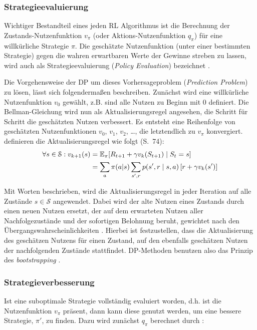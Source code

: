 \subsubsection{Strategieevaluierung}\label{sec:evaluierung}
Wichtiger Bestandteil eines jeden RL Algorithmus ist die Berechnung der Zustands-Nutzenfunktion $v_\pi$ (oder Aktions-Nutzenfunktion $q_\pi$) für eine willkürliche Strategie $\pi$. Die geschätzte Nutzenfunktion (unter einer bestimmten Strategie) gegen die wahren erwartbaren Werte der Gewinne streben zu lassen, wird auch als Strategieevaluierung (\textit{Policy Evaluation}) bezeichnet \cite[S.~74]{Sutton1998}.
\par 
Die Vorgehensweise der DP um dieses Vorhersageproblem (\textit{Prediction Problem}) zu lösen, lässt sich folgendermaßen beschreiben. Zunächst wird eine willkürliche Nutzenfunktion $v_0$ gewählt, z.B. sind alle Nutzen zu Beginn mit 0 definiert. Die Bellman-Gleichung wird nun als Aktualisierungsregel angesehen, die Schritt für Schritt die geschätzten Nutzen verbessert. Es entsteht eine Reihenfolge von geschätzten Nutzenfunktionen $v_0$, $v_1$, $v_2$, \dots, die letztendlich zu $v_\pi$ konvergiert. \cite{Sutton1998} definieren die Aktualisierungsregel wie folgt (S.~74):
\begin{equation}\label{eq:fullbackup}
    \begin{aligned}
        \forall s \in \mathcal{S}: v_{k+1}(s) &= \operatorname{\mathbb{E}}_{\pi}[ R_{t+1} + \gamma v_k(S_{t+1}) \mid S_t = s] \\
        &= \sum_a{\pi(a|s) \sum_{s',r}p(s',r\mid s, a) \left[r+\gamma v_k(s')\right]}
    \end{aligned}
\end{equation}

Mit Worten beschrieben, wird die Aktualisierungsregel in jeder Iteration auf alle Zustände $s \in \mathcal{S}$ angewendet. Dabei wird der alte Nutzen eines Zustands durch einen neuen Nutzen ersetzt, der auf dem erwarteten Nutzen aller Nachfolgezustände und der sofortigen Belohnung beruht, gewichtet nach den Übergangswahrscheinlichkeiten \cite[S.~20]{Wiering}. Hierbei ist festzustellen, dass die  Aktualisierung des geschätzen Nutzens für einen Zustand, auf den ebenfalls geschätzen Nutzen der nachfolgenden Zustände stattfindet. DP-Methoden benutzen also das Prinzip des \textit{bootstrapping} \cite[S.~89]{Sutton1998}.

\subsubsection{Strategieverbesserung}
Ist eine suboptimale Strategie vollständig evaluiert worden, d.h. ist die Nutzenfunktion $v_\pi$ präsent, dann kann diese genutzt werden, um eine bessere Strategie, $\pi'$, zu finden. Dazu wird zunächst $q_\pi$ berechnet durch \cite[S.~21]{Wiering}:


